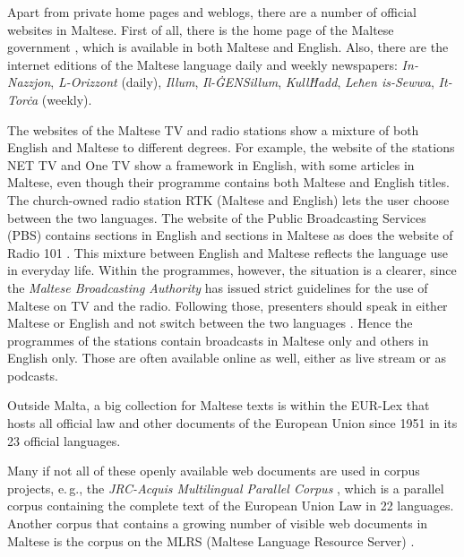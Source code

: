 \documentclass[]{../../metanetpaper}
\begin{document}
\begin{multicols}{2}
Apart from private home pages and weblogs, there are a number of official websites in Maltese. First of all, there is the home page of the Maltese government \cite{GovernmentOfMalta1}, which is available in both Maltese and English. Also, there are the internet editions of the Maltese language daily and weekly newspapers: \emph{In-Nazzjon}, \emph{L-Orizzont} (daily), \emph{Illum}, \emph{Il-ĠENSillum}, \emph{KullĦadd}, \emph{Leħen is-Sewwa}, \emph{It-Torċa} (weekly).  

The websites of the Maltese TV and radio stations show a mixture of both English and Maltese to different degrees. For example, the website of the stations NET TV \cite{NetTV1} and One TV \cite{OneTV1} show a framework in English, with some articles in Maltese, even though their programme contains both Maltese and English titles. The church-owned radio station RTK \cite{RTK1} (Maltese and English) lets the user choose between the two languages. The website of the Public Broadcasting Services (PBS) \cite{PBS1} contains sections in English and sections in Maltese as does the website of Radio 101 \cite{radio101}. This mixture between English and Maltese reflects the language use in everyday life. Within the programmes, however, the situation is a clearer, since the \emph{Maltese Broadcasting Authority} has issued strict guidelines for the use of Maltese on TV and the radio. Following those, presenters should speak in either Maltese or English and not switch between the two languages \cite{Fabri:2011a}. Hence the programmes of the stations contain broadcasts in Maltese only and others in English only. Those are often available online as well, either as live stream or as podcasts.

Outside Malta, a big collection for Maltese texts is within the EUR-Lex \cite{EURLex1} that hosts all official law and other documents of the European Union since 1951 in its 23 official languages.

Many if not all of these openly available web documents are used in corpus projects, e.\,g., the \emph{JRC-Acquis Multilingual Parallel Corpus} \cite{JRC-Acquis1}, which is a parallel corpus containing the complete text of the European Union Law in 22 languages. Another corpus that contains a growing number of visible web documents in Maltese is the corpus on the MLRS (Maltese Language Resource Server) \cite{MLRS1}.
\end{multicols}

\clearpage

\end{document}
